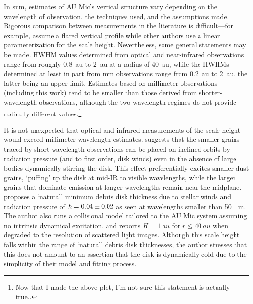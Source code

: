 \documentclass[modern]{aastex62}
\begin{document}
In sum, estimates of AU Mic's vertical structure vary depending on the wavelength of observation, the techniques used, and the assumptions made.
Rigorous comparison between measurements in the literature is difficult---for example, \citet{krist05} assume a flared vertical profile while other authors use a linear parameterization for the scale height.
Nevertheless, some general statements may be made.
HWHM values determined from optical and near-infrared observations range from roughly \SI{0.8}{au} to \SI{2}{au} at a radius of \SI{40}{au}, while the HWHMs determined at least in part from mm observations range from \SI{0.2}{au} to \SI{2}{au}, the latter being an upper limit. 
Estimates based on millimeter observations (including this work) tend to be smaller than those derived from shorter-wavelength observations, although the two wavelength regimes do not provide radically different values.\footnote{Now that I made the above plot, I'm not sure this statement is actually true..}

It is not unexpected that optical and infrared measurements of the scale height would exceed millimeter-wavelength estimates.
\citet{thebault09} suggests that the smaller grains traced by short-wavelength observations can be placed on inclined orbits by radiation pressure (and to first order, disk winds) even in the absence of large bodies dynamically stirring the disk. 
This effect preferentially excites smaller dust grains, `puffing' up the disk at mid-IR to visible wavelengths, while the larger grains that dominate emission at longer wavelengths remain near the midplane.
\citet{thebault09} proposes a `natural' minimum debris disk thickness due to stellar winds and radiation pressure of $h = \num{0.04 \pm 0.02}$ as seen at wavelengths smaller than \SI{50}{\mu \meter}.
The author also runs a collisional model tailored to the AU Mic system assuming no intrinsic dynamical excitation, and reports $H = \SI{1}{au}$ for $r \leq \SI{40}{au}$ when degraded to the resolution of scattered light images.
Although this scale height falls within the range of `natural' debris disk thicknesses, the author stresses that this does not amount to an assertion that the disk is dynamically cold due to the simplicity of their model and fitting process.
\end{document}
